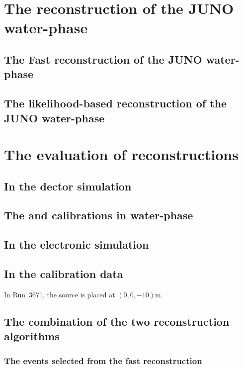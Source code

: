 \section{The reconstruction of the JUNO water-phase}

\subsection{The Fast reconstruction of the JUNO water-phase}
\subsection{The likelihood-based reconstruction of the JUNO water-phase}

\section{The evaluation of reconstructions}
\subsection{In the dector simulation}
\subsection{The  and  calibrations in water-phase}
\subsection{In the electronic simulation}
\subsection{In the calibration data}
In Run~3671, the  source is placed at $(0,0,-10)$\si{m}.

\subsection{The combination of the two reconstruction algorithms}
\subsubsection{The events selected from the fast reconstruction}
